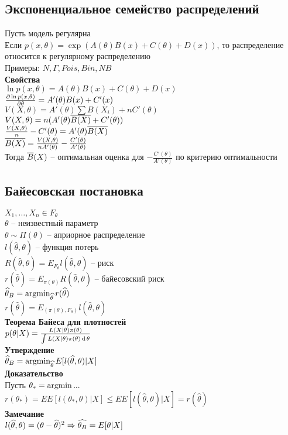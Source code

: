 \documentclass[12pt]{article}
\begin{document}
\subsection{Экспоненциальное семейство распределений}
Пусть модель регулярна\\
Если $p(x, \theta) = \exp(A(\theta)B(x) + C(\theta) + D(x))$, то распределение относится к регулярному распределению\\
Примеры: $N, \Gamma, Pois, Bin, NB$\\
\textbf{Свойства}\\
$\ln p(x, \theta) = A(\theta)B(x) + C(\theta) + D(x)$\\
$\frac{\partial \ln p(x, \theta)}{\partial \theta} = A'(\theta) B(x) + C'(x)$\\
$V(X, \theta) = A'(\theta)\sum B(X_i) + nC'(\theta)$\\
$V(X, \theta) = n(A'(\theta) \overline{B(X)} + C'(\theta))$\\
$\frac{V(X, \theta)}{n} - C'(\theta) = A'(\theta) \overline{B(X)}$\\
$\overline{B(X)} = \frac{V(X, \theta)}{n A'(\theta)} - \frac{C'(\theta)}{A'(\theta)}$\\
Тогда $\overline B(X)$ -- оптимальная оценка для $- \frac{C'(\theta)}{A'(\theta)}$ по критерию оптимальности
\subsection{Байесовская постановка}
$X_1, \ldots, X_n \in F_\theta$\\
$\theta$ -- неизвестный параметр \\
$\theta \sim \Pi(\theta)$ -- априорное распределение\\
$l(\widehat \theta, \theta)$ -- функция потерь\\
$R(\widehat \theta, \theta) = E_{F_\theta}l(\widehat \theta, \theta)$ -- риск\\
$r(\widehat \theta) = E_{\pi(\theta)} R(\widehat \theta, \theta)$ -- байесовский риск\\
$\widehat \theta_B = \operatorname{argmin}_{\widehat \theta} r(\widehat \theta)$\\
$r(\widehat \theta) = E_{(\pi(\theta), F_\theta)}l(\widehat \theta, \theta)$\\
\textbf{Теорема Байеса для плотностей}\\
$p(\theta|X) = \frac{L(X|\theta)\pi(\theta)}{\int L(X|\theta)\pi(\theta) \operatorname{d} \theta}$\\
\textbf{Утверждение}\\
$\widehat \theta_B = \operatorname{argmin}_{\widehat \theta} E[l(\widehat{\theta}, \theta)| X]$\\
\textbf{Доказательство}\\
Пусть $\theta_* = \operatorname{argmin} ...$\\
$r(\theta_*) = EE[l(\theta_*, \theta)|X] \leq EE[l(\widehat \theta, \theta)|X] = r(\widehat \theta)$\\
\textbf{Замечание}\\
$l(\widehat \theta, \theta) = (\theta - \widehat \theta)^2 \Rightarrow \widehat{\theta_B} = E[\theta|X]$\\
\end{document}
